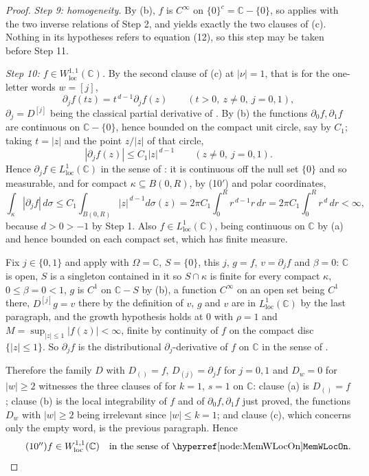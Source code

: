 \begin{proof}
\emph{Step 9: homogeneity.}  By (b), $f$ is $C^\infty$ on
$\{0\}^{c}=\mathbb{C}-\{0\}$, so  applies with the
two inverse relations of Step 2, and yields exactly the two clauses of (c).
Nothing in its hypotheses refers to equation (12), so this step may be taken
before Step 11.

\emph{Step 10: $f\in W^{1,1}_{\mathrm{loc}}(\mathbb{C})$.}  By the second
clause of (c) at $|\nu|=1$, that is for the one-letter words $w=[j]$,
\[
  \partial_jf(tz)=t^{\,d-1}\partial_jf(z)\qquad(t>0,\ z\neq0,\ j=0,1),
\]
$\partial_j=D^{[j]}$ being the classical partial derivative of
.  By (b) the functions $\partial_0f,\partial_1f$ are
continuous on $\mathbb{C}-\{0\}$, hence bounded on the compact unit circle, say
by $C_1$; taking $t=|z|$ and the point $z/|z|$ of that circle,
\begin{equation}\tag{10$'$}
  |\partial_jf(z)|\le C_1|z|^{\,d-1}\qquad(z\neq0,\ j=0,1).
\end{equation}
Hence $\partial_jf\in L^1_{\mathrm{loc}}(\mathbb{C})$ in the sense of
: it is continuous off the null set $\{0\}$ and so
measurable, and for compact $\kappa\subseteq B(0,R)$, by (10$'$) and polar
coordinates,
\[
  \int_\kappa|\partial_jf|\,d\sigma
  \le C_1\int_{B(0,R)}|z|^{\,d-1}d\sigma(z)
  =2\pi C_1\int_0^{R}r^{\,d-1}r\,dr=2\pi C_1\int_0^{R}r^{\,d}\,dr<\infty,
\]
because $d>0>-1$ by Step 1.  Also $f\in L^1_{\mathrm{loc}}(\mathbb{C})$, being
continuous on $\mathbb{C}$ by (a) and hence bounded on each compact set, which
has finite measure.

Fix $j\in\{0,1\}$ and apply  with
$\Omega=\mathbb{C}$, $S=\{0\}$, this $j$, $g=f$, $v=\partial_jf$ and
$\beta=0$: $\mathbb{C}$ is open, $S$ is a singleton contained in it so
$S\cap\kappa$ is finite for every compact $\kappa$, $0\le\beta=0<1$, $g$ is
$C^1$ on $\mathbb{C}-S$ by (b), a function $C^\infty$ on an open set being
$C^1$ there, $D^{[j]}g=v$ there by the definition of $v$,
$g$ and $v$ are in $L^1_{\mathrm{loc}}(\mathbb{C})$ by the last paragraph, and
the growth hypothesis holds at $0$ with $\rho=1$ and
$M=\sup_{|z|\le1}|f(z)|<\infty$, finite by continuity of $f$ on the compact
disc $\{|z|\le1\}$.  So $\partial_jf$ is the distributional
$\partial_j$-derivative of $f$ on $\mathbb{C}$ in the sense of
.

Therefore the family $D$ with $D_{()}=f$, $D_{(j)}=\partial_jf$ for $j=0,1$ and
$D_w=0$ for $|w|\ge2$ witnesses the three clauses of  for
$k=1$, $s=1$ on $\mathbb{C}$: clause (a) is $D_{()}=f$; clause (b) is the local
integrability of $f$ and of $\partial_0f,\partial_1f$ just proved, the
functions $D_w$ with $|w|\ge2$ being irrelevant since $|w|\le k=1$; and clause
(c), which concerns only the empty word, is the previous paragraph.  Hence
\begin{equation}\tag{10$''$}
  f\in W^{1,1}_{\mathrm{loc}}(\mathbb{C})\quad\text{in the sense of
  \noderef{MemWLocOn}} .
\end{equation}


\end{proof}
